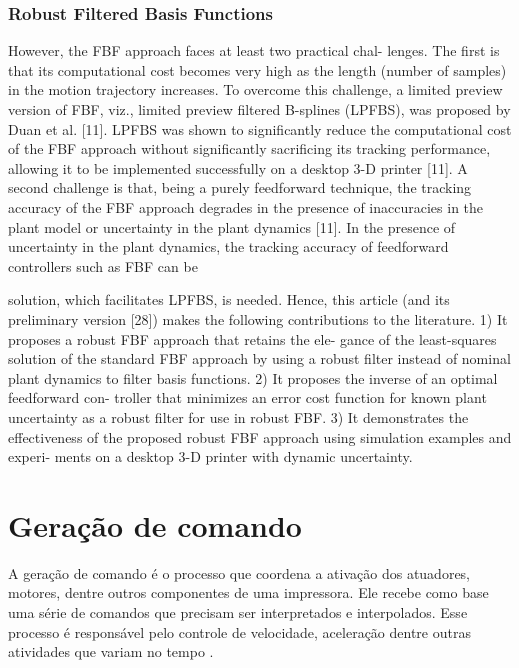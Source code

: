 \subsubsection{Robust Filtered Basis Functions}

However, the FBF approach faces at least two practical chal-
lenges. The first is that its computational cost becomes very
high as the length (number of samples) in the motion trajectory
increases. To overcome this challenge, a limited preview version
of FBF, viz., limited preview filtered B-splines (LPFBS), was
proposed by Duan et al. [11]. LPFBS was shown to significantly
reduce the computational cost of the FBF approach without
significantly sacrificing its tracking performance, allowing it to
be implemented successfully on a desktop 3-D printer [11]. A
second challenge is that, being a purely feedforward technique,
the tracking accuracy of the FBF approach degrades in the
presence of inaccuracies in the plant model or uncertainty in
the plant dynamics [11].
In the presence of uncertainty in the plant dynamics, the
tracking accuracy of feedforward controllers such as FBF can be

solution, which facilitates LPFBS, is needed.
Hence, this article (and its preliminary version [28]) makes
the following contributions to the literature.
1) It proposes a robust FBF approach that retains the ele-
gance of the least-squares solution of the standard FBF
approach by using a robust filter instead of nominal plant
dynamics to filter basis functions.
2) It proposes the inverse of an optimal feedforward con-
troller that minimizes an error cost function for known
plant uncertainty as a robust filter for use in robust FBF.
3) It demonstrates the effectiveness of the proposed robust
FBF approach using simulation examples and experi-
ments on a desktop 3-D printer with dynamic uncertainty.

\section{Geração de comando}
A geração de comando é o processo que coordena a ativação dos 
atuadores, motores, dentre outros componentes de uma impressora. 
Ele recebe como base uma série de comandos que precisam ser 
interpretados e interpolados. Esse processo é responsável pelo 
controle de velocidade, aceleração dentre outras atividades que 
variam no tempo \cite{yu20}. 

